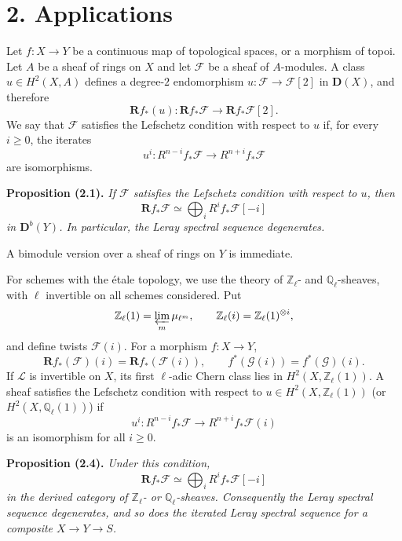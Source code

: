 \documentclass[11pt]{article}
\newcommand{\bD}{\mathbf D}
\newcommand{\cF}{\mathcal F}
\newcommand{\cG}{\mathcal G}
\newcommand{\bR}{\mathbf R}
\newcommand{\Ql}{\mathbb Q_\ell}
\newcommand{\Zl}{\mathbb Z_\ell}
\newenvironment{named}[1]{\par\medskip\noindent\textbf{#1}\itshape}{\par\medskip}
\begin{document}
\section*{2. Applications}
Let $f:X\to Y$ be a continuous map of topological spaces, or a morphism of topoi. Let $A$ be a sheaf of rings on $X$ and let $\cF$ be a sheaf of $A$-modules. A class $u\in H^2(X,A)$ defines a degree-$2$ endomorphism $u:\cF\to\cF[2]$ in $\bD(X)$, and therefore
\[
\bR f_*(u):\bR f_*\cF\longrightarrow \bR f_*\cF[2].
\]
We say that $\cF$ satisfies the Lefschetz condition with respect to $u$ if, for every $i\ge0$, the iterates
\[
u^i:R^{n-i}f_*\cF\longrightarrow R^{n+i}f_*\cF
\]
are isomorphisms.

\begin{named}{Proposition (2.1).}
If $\cF$ satisfies the Lefschetz condition with respect to $u$, then
\[
\bR f_*\cF\simeq\bigoplus_iR^if_*\cF[-i]
\]
in $\bD^b(Y)$. In particular, the Leray spectral sequence degenerates.
\end{named}
A bimodule version over a sheaf of rings on $Y$ is immediate.

For schemes with the étale topology, we use the theory of $\Zl$- and $\Ql$-sheaves, with $\ell$ invertible on all schemes considered. Put
\[
\Zl(1)=\varprojlim_m\mu_{\ell^m},\qquad \Zl(i)=\Zl(1)^{\otimes i},
\]
and define twists $\cF(i)$. For a morphism $f:X\to Y$,
\begin{equation}\tag{2.3}
\bR f_*(\cF)(i)=\bR f_*(\cF(i)),\qquad f^*(\cG(i))=f^*(\cG)(i).
\end{equation}
If $\mathscr L$ is invertible on $X$, its first $\ell$-adic Chern class lies in $H^2(X,\Zl(1))$. A sheaf satisfies the Lefschetz condition with respect to $u\in H^2(X,\Zl(1))$ (or $H^2(X,\Ql(1))$) if
\[
u^i:R^{n-i}f_*\cF\longrightarrow R^{n+i}f_*\cF(i)
\]
is an isomorphism for all $i\ge0$.

\begin{named}{Proposition (2.4).}
Under this condition,
\begin{equation}\tag{2.5}
\bR f_*\cF\simeq\bigoplus_iR^if_*\cF[-i]
\end{equation}
in the derived category of $\Zl$- or $\Ql$-sheaves. Consequently the Leray spectral sequence degenerates, and so does the iterated Leray spectral sequence for a composite $X\to Y\to S$.
\end{named}
\end{document}
